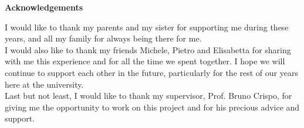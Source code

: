 \thispagestyle{empty}

\begin{center}
  {\bf \Huge Acknowledgements}
\end{center}

\vspace{4cm}

I would like to thank my parents and my sister for supporting me during these years,
and all my family for always being there for me.\\
I would also like to thank my friends Michele, Pietro and Elisabetta for
sharing with me this experience and for all the time we spent together. I hope
we will continue to support each other in the future, particularly
for the rest of our years here at the university.\\
Last but not least, I would like to thank my supervisor, Prof. Bruno Crispo,
for giving me the opportunity to work on this project and for his precious
advice and support.